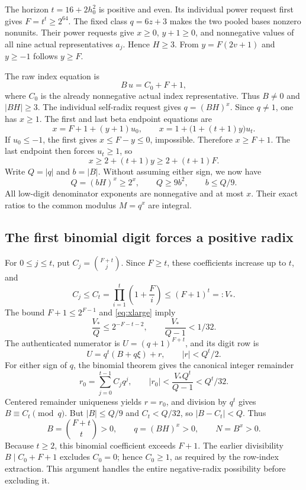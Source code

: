 \documentclass[11pt]{article}
\theoremstyle{remark}\newtheorem{remark}[theorem]{Remark}
\begin{document}
The horizon $t=16+2h_0^2$ is positive and even. Its individual power
request first gives $F=t^t\ge2^{64}$.
The fixed class $q=6z+3$ makes the two pooled bases nonzero nonunits.
Their power requests give $x\ge0$, $y+1\ge0$, and nonnegative values
of all nine actual representatives $a_j$. Hence $H\ge3$.
From $y=F(2v+1)$ and $y\ge-1$ follows $y\ge F$.

The raw index equation is
\[
 B\,u=C_0+F+1,
\]
where $C_0$ is the already nonnegative actual index representative.
Thus $B\ne0$ and $|BH|\ge3$. The individual self-radix request
gives $q=(BH)^x$. Since $q\ne1$, one has $x\ge1$.
The first and last beta endpoint equations are
\[
 x=F+1+(y+1)u_0,
 \qquad x=1+\bigl(1+(t+1)y\bigr)u_t.
\]
If $u_0\le-1$, the first gives $x\le F-y\le0$, impossible.
Therefore $x\ge F+1$. The last endpoint then forces $u_t\ge1$, so
\begin{equation}\label{eq:xlarge}
 x\ge2+(t+1)y\ge2+(t+1)F.
\end{equation}
Write $Q=|q|$ and $b=|B|$. Without assuming either sign, we now have
\[
 Q=(bH)^x\ge2^x,\qquad Q\ge9b^2,\qquad b\le Q/9.
\]
All low-digit denominator exponents are nonnegative and at most $x$.
Their exact ratios to the common modulus $M=q^x$ are integral.

\subsection{The first binomial digit forces a positive radix}

For $0\le j\le t$, put $C_j=\binom{F+t}{j}$.
Since $F\ge t$, these coefficients increase up to $t$, and
\[
 C_j\le C_t=\prod_{i=1}^t\left(1+\frac{F}{i}\right)
       \le(F+1)^t=:V_*.
\]
The bound $F+1\le2^{F-1}$ and \eqref{eq:xlarge} imply
\[
 \frac{V_*}{Q}\le2^{-F-t-2},\qquad \frac{V_*}{Q-1}<1/32.
\]
The authenticated numerator is $U=(q+1)^{F+t}$, and its digit row is
\[
 U=q^t(B+q\xi)+r,\qquad |r|<Q^t/2.
\]
For either sign of $q$, the binomial theorem gives the canonical
integer remainder
\[
 r_0=\sum_{j=0}^{t-1}C_jq^j,
 \qquad |r_0|<\frac{V_*Q^t}{Q-1}<Q^t/32.
\]
Centered remainder uniqueness yields $r=r_0$, and division by $q^t$
gives $B\equiv C_t\pmod q$. But $|B|\le Q/9$ and
$C_t<Q/32$, so $|B-C_t|<Q$. Thus
\[
 B=\binom{F+t}{t}>0,\qquad q=(BH)^x>0,\qquad N=B^x>0.
\]
Because $t\ge2$, this binomial coefficient exceeds $F+1$.
The earlier divisibility $B\mid C_0+F+1$ excludes $C_0=0$;
hence $C_0\ge1$, as required by the row-index extraction.
This argument handles the entire negative-radix possibility before
excluding it.
\end{document}
